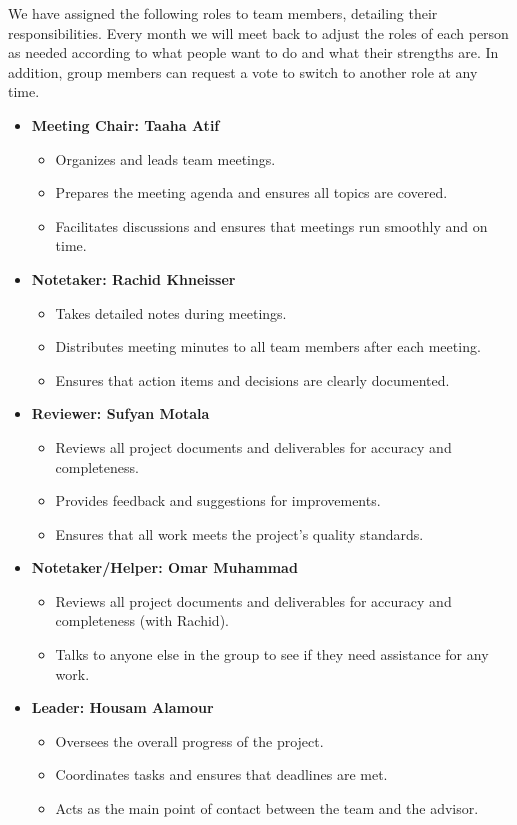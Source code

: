 \documentclass{article}
\begin{document}
We have assigned the following roles to team members, detailing their responsibilities.
Every month we will meet back to adjust the roles of each person as needed according to what people want to do and what their strengths are. In addition, group members can request a vote to switch to another role at any time.

\begin{itemize}
    \item \textbf{Meeting Chair: Taaha Atif}
    \begin{itemize}
        \item Organizes and leads team meetings.
        \item Prepares the meeting agenda and ensures all topics are covered.
        \item Facilitates discussions and ensures that meetings run smoothly and on time.
    \end{itemize}

    \item \textbf{Notetaker: Rachid Khneisser}
    \begin{itemize}
        \item Takes detailed notes during meetings.
        \item Distributes meeting minutes to all team members after each meeting.
        \item Ensures that action items and decisions are clearly documented.
    \end{itemize}

    \item \textbf{Reviewer: Sufyan Motala}
    \begin{itemize}
        \item Reviews all project documents and deliverables for accuracy and completeness.
        \item Provides feedback and suggestions for improvements.
        \item Ensures that all work meets the project’s quality standards.
    \end{itemize}

    \item \textbf{Notetaker/Helper: Omar Muhammad}
    \begin{itemize}
        \item Reviews all project documents and deliverables for accuracy and completeness (with Rachid).
        \item Talks to anyone else in the group to see if they need assistance for any work.
    \end{itemize}

    \item \textbf{Leader: Housam Alamour}
    \begin{itemize}
        \item Oversees the overall progress of the project.
        \item Coordinates tasks and ensures that deadlines are met.
        \item Acts as the main point of contact between the team and the advisor.
    \end{itemize}
\end{itemize}
\end{document}
